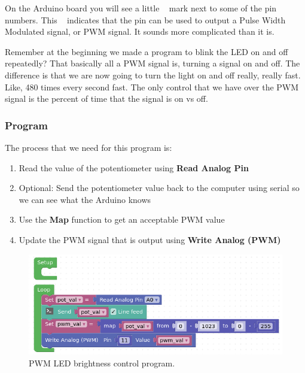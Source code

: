 \documentclass[12pt]{article}
\begin{document}
	On the Arduino board you will see a little ~ mark next to some of the pin numbers. This ~ indicates that the pin can be used to output a Pulse Width Modulated signal, or PWM signal. It sounds more complicated than it is.
	
	Remember at the beginning we made a program to blink the LED on and off repeatedly? That basically all a PWM signal is, turning a signal on and off. The difference is that we are now going to turn the light on and off really, really fast. Like, 480 times every second fast. The only control that we have over the PWM signal is the percent of time that the signal is on vs off.
	
	\subsubsection{Program}
	
	The process that we need for this program is:
	
	\begin{enumerate}
		\itemsep -1em
		\item Read the value of the potentiometer using \textbf{Read Analog Pin}
		\item Optional: Send the potentiometer value back to the computer using serial so we can see what the Arduino knows
		\item Use the \textbf{Map} function to get an acceptable PWM value
		\item Update the PWM signal that is output using \textbf{Write Analog (PWM)}
	\end{enumerate}

	
	\begin{figure}[H]
		\begin{center}
			\includegraphics[scale=0.7]{p_pwm_led_ctrl}
			\caption{PWM LED brightness control program.}
			\label{prog:pwm_led_ctrl}
		\end{center}
	\end{figure}
\end{document}
